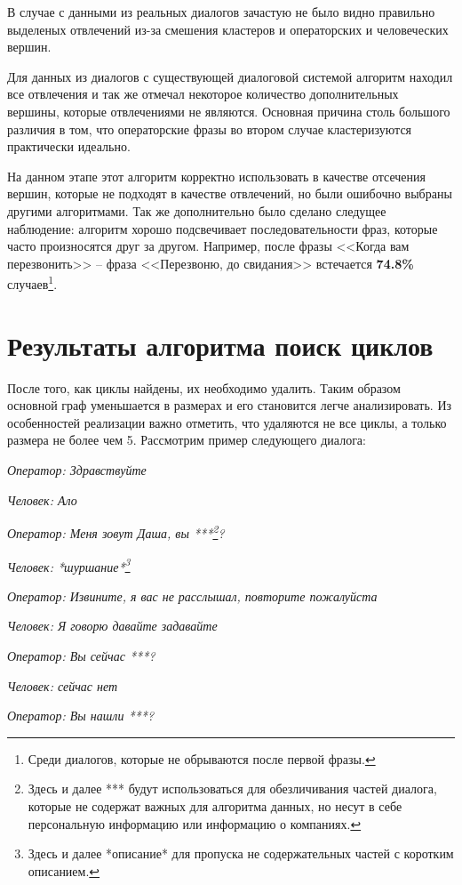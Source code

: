 \documentclass[times,specification,annotation]{itmo-student-thesis}
\begin{document}
	В случае с данными из реальных диалогов зачастую не было видно правильно выделеных отвлечений из-за смешения кластеров и операторских и человеческих вершин.
		
	Для данных из диалогов с существующей диалоговой системой алгоритм находил все отвлечения и так же отмечал некоторое количество дополнительных вершины, которые отвлечениями не являются. Основная причина столь большого различия в том, что операторские фразы во втором случае кластеризуются практически идеально. 
	
	На данном этапе этот алгоритм корректно использовать в качестве отсечения вершин, которые не подходят в качестве отвлечений, но были ошибочно выбраны другими алгоритмами. Так же дополнительно было сделано следущее наблюдение: алгоритм хорошо подсвечивает последовательности фраз, которые часто произносятся друг за другом. Например, после фразы <<Когда вам перезвонить>> -- фраза <<Перезвоню, до свидания>> встечается \textbf{74.8\%} случаев\footnote{Среди диалогов, которые не обрываются после первой фразы.}.
	
	\section{Результаты алгоритма поиск циклов}
	После того, как циклы найдены, их необходимо удалить. Таким образом основной граф уменьшается в размерах и его становится легче анализировать. Из особенностей реализации важно отметить, что удаляются не все циклы, а только размера не более чем 5. Рассмотрим пример следующего диалога:
	
	\textit{Оператор: Здравствуйте}
	
	\textit{Человек:  Ало}
	
	\textit{Оператор:  Меня зовут Даша, вы ***\footnote{Здесь и далее *** будут использоваться для обезличивания частей диалога, которые не содержат важных для алгоритма данных, но несут в себе персональную информацию или информацию о компаниях.}?}
	
	\textit{Человек:  *шуршание*\footnote{Здесь и далее *описание* для пропуска не содержательных частей с коротким описанием.}}
	
	\textit{Оператор:  Извините, я вас не расслышал, повторите пожалуйста}
	
	\textit{Человек:  Я говорю давайте задавайте}
	
	\textit{Оператор:  Вы сейчас ***?}
	
	\textit{Человек:  сейчас нет}
	
	\textit{Оператор:  Вы нашли ***?}
	
\end{document}
